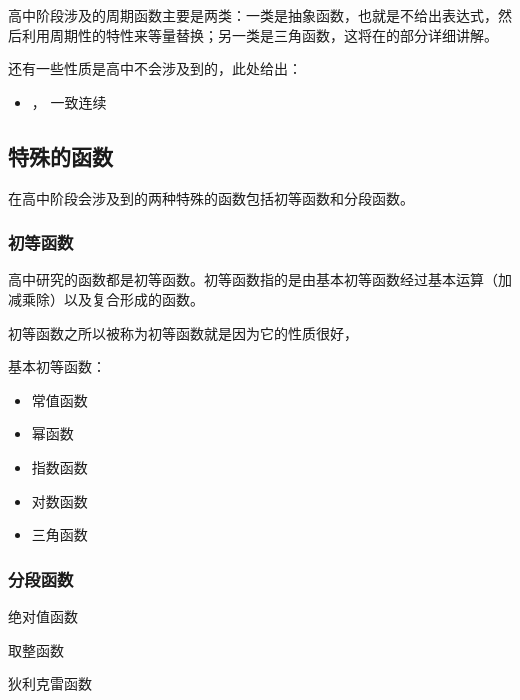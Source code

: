 高中阶段涉及的周期函数主要是两类：一类是抽象函数，也就是不给出表达式，然后利用周期性的特性来等量替换；另一类是三角函数，这将在的部分详细讲解。



还有一些性质是高中不会涉及到的，此处给出：
\begin{itemize}
\item {}， 一致连续
\end{itemize}



\subsection{特殊的函数}

在高中阶段会涉及到的两种特殊的函数包括初等函数和分段函数。

\subsubsection{初等函数}

高中研究的函数都是初等函数。初等函数指的是由基本初等函数经过基本运算（加减乘除）以及复合形成的函数。

初等函数之所以被称为初等函数就是因为它的性质很好，

基本初等函数：
\begin{itemize}
\item 常值函数
\item 幂函数
\item 指数函数
\item 对数函数
\item 三角函数
\end{itemize}

\subsubsection{分段函数}

绝对值函数

取整函数

狄利克雷函数